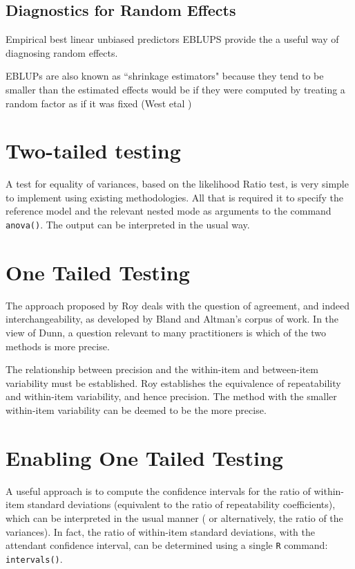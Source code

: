 \documentclass[12pt, a4paper]{report}
\theoremstyle{plain}
\theoremstyle{definition}
\theoremstyle{remark}
\begin{document}
\subsection{Diagnostics for Random Effects}
Empirical best linear unbiased predictors EBLUPS provide the a useful way of diagnosing random effects.

EBLUPs are also known as ``shrinkage estimators" because they tend to be smaller than the estimated effects would be if they were computed by treating a random factor as if it was fixed (West etal )



\newpage

\section{Two-tailed testing} A test for equality of variances, based on the likelihood Ratio test, is very simple to implement using existing methodologies. All that is required it to specify the reference model and the relevant nested mode as arguments to the command \texttt{anova()}. The output can be interpreted in the usual way.

\section{One Tailed Testing}
The approach proposed by Roy deals with the question of agreement, and indeed interchangeability, as developed by Bland and Altman's corpus of work. In the view of Dunn, a question relevant to many practitioners is which of the two methods is more precise.

The relationship between precision and the within-item and between-item variability must be established. Roy establishes the equivalence of repeatability and within-item variability, and hence precision.  The method with the smaller within-item variability can be deemed to be the more precise.

\section{Enabling One Tailed Testing}
A useful approach is to compute the confidence intervals for the ratio of within-item standard deviations (equivalent to the ratio of repeatability coefficients), which can be interpreted in the usual manner ( or alternatively, the ratio of the variances). In fact, the ratio of within-item standard deviations, with the attendant confidence interval,  can be determined using a single \texttt{R} command: \texttt{intervals()}.
\end{document}
